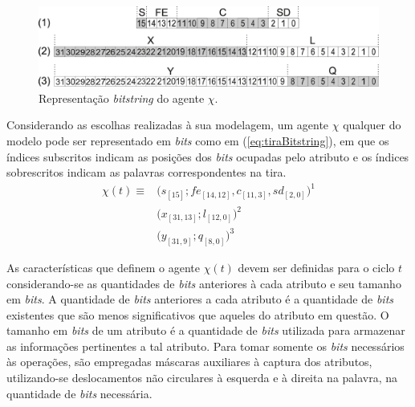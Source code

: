 \begin{figure}[H]
 \centering
 \includegraphics[width=1.0\textwidth]{Figuras/ModelagemBitstring/Tira.eps}
 \caption{Representação \textit{bitstring} do agente $\chi$.}
 \label{fig:tiraBitstring}
\end{figure} 

Considerando as escolhas realizadas à sua modelagem, um agente $\chi$ qualquer do modelo pode ser representado em \textit{bits} como em (\ref{eq:tiraBitstring}), em que os índices subscritos indicam as posições dos \textit{bits} ocupadas pelo atributo e os índices sobrescritos indicam as palavras correspondentes na tira.
\begin{equation}
\begin{split}
 \chi(t)  \equiv  & \big(s_{[15]}; fe_{[14, 12]}, c_{[11, 3]}, sd_{[2, 0]}\big)^1 \\
		  & \big(x_{[31, 13]}; l_{[12, 0]}\big)^2 \\
		  & \big(y_{[31, 9]}; q_{[8, 0]}\big)^3
 \label{eq:tiraBitstring}
\end{split}
\end{equation}

As características que definem o agente $\chi(t)$ devem ser definidas para o ciclo $t$ considerando-se as quantidades de \textit{bits} anteriores à cada atributo e seu tamanho em \textit{bits}. A quantidade de \textit{bits} anteriores a cada atributo é a quantidade de \textit{bits} existentes que são menos significativos que aqueles do atributo em questão. O tamanho em \textit{bits} de um atributo é a quantidade de \textit{bits} utilizada para armazenar as informações pertinentes a tal atributo. Para tomar somente os \textit{bits} necessários às operações, são empregadas máscaras auxiliares à captura dos atributos, utilizando-se deslocamentos não circulares à esquerda e à direita na palavra, na quantidade de \textit{bits} necessária.


